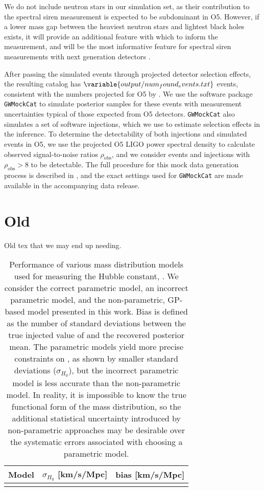 \documentclass[]{aastex631}
\begin{document}
We do not include neutron stars in our simulation set, as their contribution to the spectral siren measurement is expected to be subdominant in \ac{O5}.
However, if a lower mass gap between the heaviest neutron stars and lightest black holes exists, it will provide an additional feature with which to inform the measurement, and will be the most informative feature for spectral siren measurements with next generation detectors \citep{ezquiaga_spectral_2022}.

After passing the simulated events through projected detector selection effects, the resulting catalog has $\variable{output/num_found_events.txt}$ events, consistent with the numbers projected for \ac{O5} by \citet{kiendrebogo_observing_2023}.
We use the software package \texttt{GWMockCat} \citep{farah_things_2023} to simulate posterior samples for these events with measurement uncertainties typical of those expected from \ac{O5} detectors.
\texttt{GWMockCat} also simulates a set of software injections, which we use to estimate selection effects in the inference.
To determine the detectability of both injections and simulated events in O5, we use the projected \ac{O5} LIGO power spectral density \citep{dccpage} to calculate observed signal-to-noise ratios $\rho_{\text{obs}}$, and we consider events and injections with $\rho_{\text{obs}}>8$ to be detectable. 
The full procedure for this mock data generation process is described in \citet{fishbach_where, farah_things_2023, essick_dagnabbit_2023}, and the exact settings used for \texttt{GWMockCat} are made available in the accompanying data release.

\section{Old}
Old tex that we may end up needing.

\begin{table}[]
    \centering
    \begin{tabular}{c|c c}
         Model & $\sigma_{H_0}$ [km/s/Mpc] & bias [km/s/Mpc]\\
         \hline
         & 
    \end{tabular}
    \caption{Performance of various mass distribution models used for measuring the Hubble constant, \Ho.
    We consider the correct parametric model, an incorrect parametric model, and the non-parametric, \ac{GP}-based model presented in this work.
    Bias is defined as the number of standard deviations between the true injected value of \Ho and the recovered posterior mean. 
    The parametric models yield more precise constraints on \Ho{}, as shown by smaller standard deviations ($\sigma_{H_0}$), but the incorrect parametric model is less accurate than the non-parametric model.
    In reality, it is impossible to know the true functional form of the mass distribution, so the additional statistical uncertainty introduced by non-parametric approaches may be desirable over the systematic errors associated with choosing a parametric model.
    }
    \label{tab:bias}
\end{table}
\end{document}
